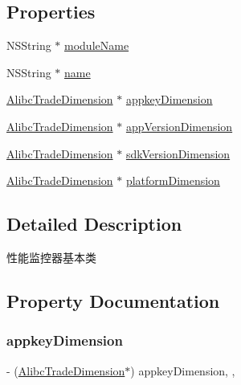 \subsection*{Properties}
\begin{DoxyCompactItemize}
\item 
N\+S\+String $\ast$ \mbox{\hyperlink{interface_alibc_trade_monitor_a1b0f81ce99f149493a2c96675c7e8e29}{module\+Name}}
\item 
N\+S\+String $\ast$ \mbox{\hyperlink{interface_alibc_trade_monitor_a0098089f5290f6b941001a5e2cd06bbd}{name}}
\item 
\mbox{\hyperlink{interface_alibc_trade_dimension}{Alibc\+Trade\+Dimension}} $\ast$ \mbox{\hyperlink{interface_alibc_trade_monitor_abf63c59e0f713da1ae437305babf53d4}{appkey\+Dimension}}
\item 
\mbox{\hyperlink{interface_alibc_trade_dimension}{Alibc\+Trade\+Dimension}} $\ast$ \mbox{\hyperlink{interface_alibc_trade_monitor_a847e588e8babab990a4ae51f0f2bbcdc}{app\+Version\+Dimension}}
\item 
\mbox{\hyperlink{interface_alibc_trade_dimension}{Alibc\+Trade\+Dimension}} $\ast$ \mbox{\hyperlink{interface_alibc_trade_monitor_a9e907925d76d671b54618341b695a607}{sdk\+Version\+Dimension}}
\item 
\mbox{\hyperlink{interface_alibc_trade_dimension}{Alibc\+Trade\+Dimension}} $\ast$ \mbox{\hyperlink{interface_alibc_trade_monitor_adaf42fd707fc67ee4b4bb42c0dcbde9e}{platform\+Dimension}}
\end{DoxyCompactItemize}


\subsection{Detailed Description}
性能监控器基本类 

\subsection{Property Documentation}
\mbox{\label{interface_alibc_trade_monitor_abf63c59e0f713da1ae437305babf53d4}} 
\subsubsection{\texorpdfstring{appkey\+Dimension}{appkeyDimension}}
{\footnotesize\ttfamily -\/ (\mbox{\hyperlink{interface_alibc_trade_dimension}{Alibc\+Trade\+Dimension}}$\ast$) appkey\+Dimension\hspace{0.3cm}{\ttfamily [read]}, {\ttfamily [nonatomic]}, {\ttfamily [strong]}}

